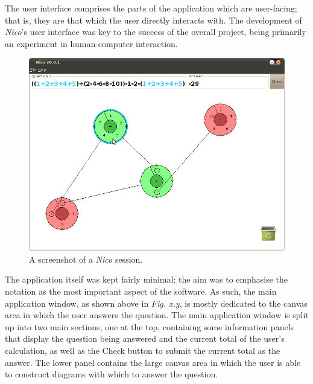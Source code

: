 \documentclass[12pt,twoside,notitlepage,xetex]{report}
\begin{document}
The user interface comprises the parts of the application which are
user-facing; that is, they are that which the user directly interacts with.
The development of \emph{Nico}'s user interface was key to the success of the
overall project, being primarily an experiment in human-computer interaction.

\begin{center}
\begin{figure}[H]
\begin{center}
\includegraphics[width=\textwidth]{figs/nico_screen_01.png}
\end{center}
\caption{A screenshot of a \emph{Nico} session.}
\end{figure}
\end{center}

The application itself was kept fairly minimal: the aim was to emphasise the
notation as the most important aspect of the software.  As such, the main
application window, as shown above in \emph{Fig. x.y}, is mostly dedicated to
the canvas area in which the user answers the question.  The main application
window is split up into two main sections, one at the top, containing some
information panels that display the question being answered and the current
total of the user's calculation, as well as the {\sfapp Check} button to submit
the current total as the answer.  The lower panel contains the large canvas
area in which the user is able to construct diagrams with which to answer the
question.

\end{document}
